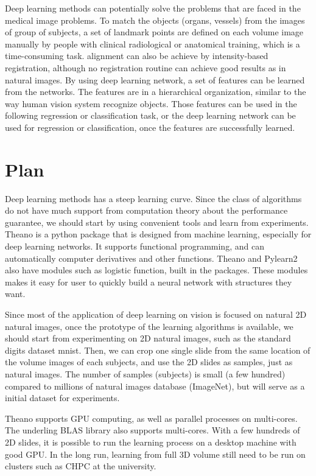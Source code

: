 \documentclass[12pt]{article}
\begin{document}
Deep learning methods can potentially solve the problems that are faced in the
medical image problems. To match the objects (organs, vessels) from the images
of group of subjects, a set of landmark points are defined on each volume
image manually by people with clinical radiological or anatomical training,
which is a time-consuming task. alignment can also be achieve by
intensity-based registration, although no registration routine can achieve
good results as in natural images. By using deep learning network, a set of
features can be learned from the networks. The features are in a hierarchical
organization, similar to the way human vision system recognize objects. Those
features can be used in the following regression or classification task, or
the deep learning network can be used for regression or classification, once
the features are successfully learned. 
\section{Plan}
Deep learning methods has a steep learning curve. Since the class of
algorithms do not have much support from computation theory about the
performance guarantee, we should start by using convenient tools and learn
from experiments. \textsf{Theano} is a python package that is designed from
machine learning, especially for deep learning networks. It supports
functional programming, and can automatically computer derivatives and other
functions. \textsf{Theano} and \textsf{Pylearn2} also have modules such as
logistic function, built in the packages. These modules makes it easy for user
to quickly build a neural network with structures they want. 

Since most of the application of deep learning on vision is focused on natural
2D natural images, once the prototype of the learning algorithms is available,
we should start from experimenting on 2D natural images, such as the standard
digits dataset \textsf{mnist}. Then, we can crop one single slide from the
same location of the volume images of each subjects, and use the 2D slides as
samples, just as natural images. The number of samples (subjects) is small (a
few hundred) compared to millions of natural images database
(\textsf{ImageNet}), but will serve as a initial dataset for experiments. 

Theano supports GPU computing, as well as parallel processes on
multi-cores. The underling BLAS library also supports multi-cores. With a few
hundreds of 2D slides, it is possible to run the learning process on a desktop
machine with good GPU. In the long run, learning from full 3D volume still
need to be run on clusters such as CHPC at the university. 
\end{document}
